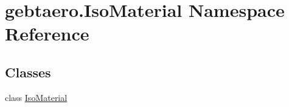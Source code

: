 \hypertarget{namespacegebtaero_1_1_iso_material}{}\section{gebtaero.\+Iso\+Material Namespace Reference}
\label{namespacegebtaero_1_1_iso_material}
\subsection*{Classes}
\begin{DoxyCompactItemize}
\item 
class \hyperlink{classgebtaero_1_1_iso_material_1_1_iso_material}{Iso\+Material}
\end{DoxyCompactItemize}
